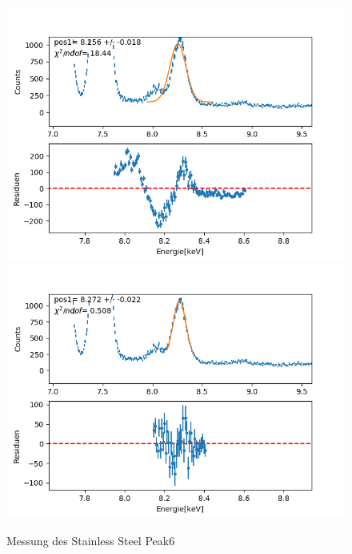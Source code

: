 \documentclass[12pt,a4paper]{article}
\begin{document}
\begin{figure}[H]
\centering
\includegraphics[scale=0.49]{Bilder/roentgen_spektren/stahl/rub6_1.png}
\includegraphics[scale=0.49]{Bilder/roentgen_spektren/stahl/rub6_2.png}
\caption{Messung des Stainless Steel Peak6}
\end{figure}
\end{document}

